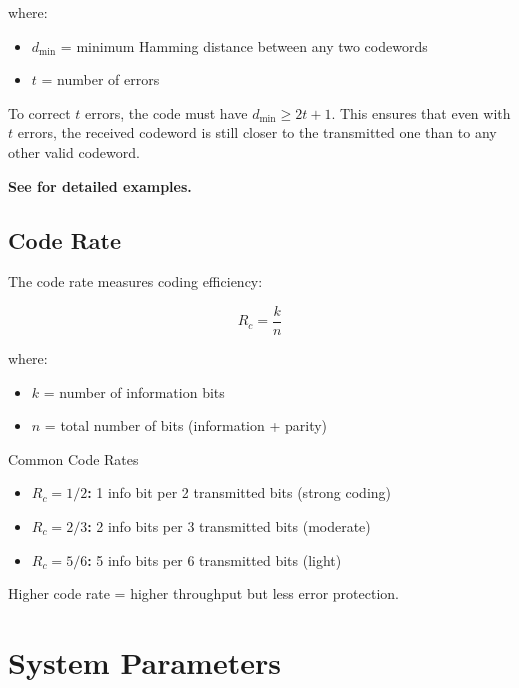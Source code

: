 where:
\begin{itemize}
\item $d_{\min}$ = minimum Hamming distance between any two codewords
\item $t$ = number of errors
\end{itemize}

\begin{keyconcept}
To correct $t$ errors, the code must have $d_{\min} \geq 2t + 1$. This ensures that even with $t$ errors, the received codeword is still closer to the transmitted one than to any other valid codeword.
\end{keyconcept}

\textbf{See  for detailed examples.}

\subsection{Code Rate}
\label{subsec:code-rate}

The code rate measures coding efficiency:

\begin{equation}
\label{eq:code-rate}
R_c = \frac{k}{n}
\end{equation}

where:
\begin{itemize}
\item $k$ = number of information bits
\item $n$ = total number of bits (information + parity)
\end{itemize}

\begin{calloutbox}{Common Code Rates}
\begin{itemize}
\item \textbf{$R_c = 1/2$:} 1 info bit per 2 transmitted bits (strong coding)
\item \textbf{$R_c = 2/3$:} 2 info bits per 3 transmitted bits (moderate)
\item \textbf{$R_c = 5/6$:} 5 info bits per 6 transmitted bits (light)
\end{itemize}
Higher code rate = higher throughput but less error protection.
\end{calloutbox}

\section{System Parameters}
\label{sec:system-parameters}

